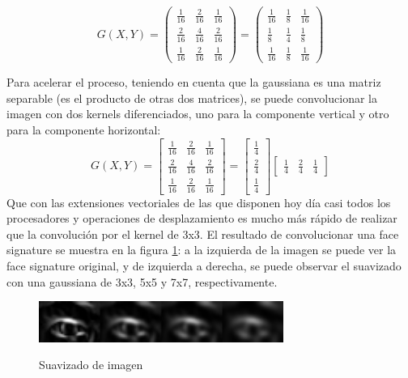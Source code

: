 \[
G(X,Y) = \left(
\begin{array}{lcr}
	\frac{1}{16} & \frac{2}{16} & \frac{1}{16}\\
	\frac{2}{16} & \frac{4}{16} & \frac{2}{16}\\
	\frac{1}{16} & \frac{2}{16} & \frac{1}{16}
\end{array}
\right) = \left(
\begin{array}{lcr}
	\frac{1}{16} & \frac{1}{8} & \frac{1}{16}\\
	\frac{1}{8} & \frac{1}{4} & \frac{1}{8}\\
	\frac{1}{16} & \frac{1}{8} & \frac{1}{16}
\end{array} \right)
\]

Para acelerar el proceso, teniendo en cuenta que la gaussiana es una matriz separable (es el producto de otras dos matrices), se puede convolucionar la imagen con dos kernels diferenciados, uno para la componente vertical y otro para la componente horizontal:
\[
G(X,Y) = \left[
\begin{array}{lcr}
	\frac{1}{16} & \frac{2}{16} & \frac{1}{16}\\
	\frac{2}{16} & \frac{4}{16} & \frac{2}{16}\\
	\frac{1}{16} & \frac{2}{16} & \frac{1}{16}
\end{array}
\right] = \left[
\begin{array}{c}
	\frac{1}{4} \\ \frac{2}{4} \\ \frac{1}{4}
\end{array}
\right]
\left[
\begin{array}{lcr}
	\frac{1}{4} & \frac{2}{4} & \frac{1}{4}
\end{array}
\right]
\]
Que con las extensiones vectoriales de las que disponen hoy día casi todos los procesadores y operaciones de desplazamiento es mucho más rápido de realizar que la convolución por el kernel de 3x3. El resultado de convolucionar una face signature se muestra en la figura \ref{fig:smooth}: a la izquierda de la imagen se puede ver la face signature original, y de izquierda a derecha, se puede observar el suavizado con una gaussiana de 3x3, 5x5 y 7x7, respectivamente.

	\begin{figure}[h!]
		\centering
		\includegraphics[width=8cm]{imagenes/suavizado.png}\\
		\caption{Suavizado de imagen}
		\label{fig:smooth}
	\end{figure}



